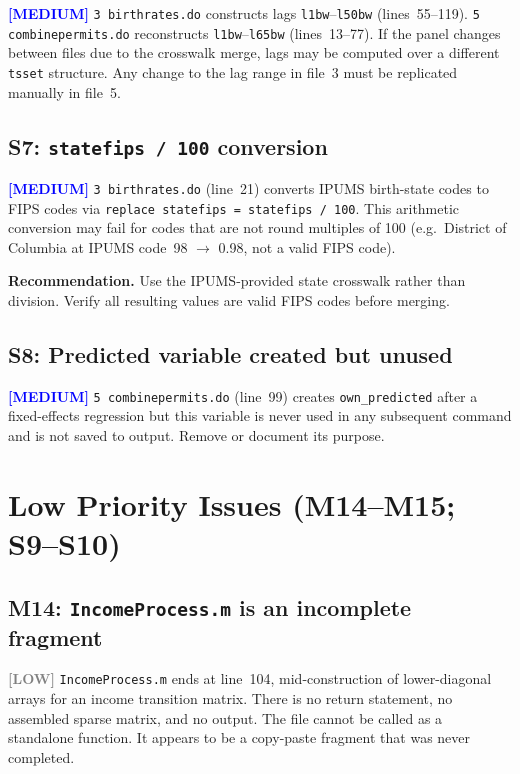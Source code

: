 \documentclass[11pt]{article}
\newcommand{\medium}{\textcolor{blue}{\textbf{[MEDIUM]}}}
\newcommand{\low}{\textcolor{gray}{\textbf{[LOW]}}}
\begin{document}
\medium{} \texttt{3 birthrates.do} constructs lags \texttt{l1bw}--\texttt{l50bw}
(lines~55--119). \texttt{5 combinepermits.do} reconstructs \texttt{l1bw}--\texttt{l65bw}
(lines~13--77). If the panel changes between files due to the crosswalk merge,
lags may be computed over a different \texttt{tsset} structure. Any change to the
lag range in file~3 must be replicated manually in file~5.

\subsection*{S7: \texttt{statefips / 100} conversion}

\medium{} \texttt{3 birthrates.do} (line~21) converts IPUMS birth-state codes to
FIPS codes via \texttt{replace statefips = statefips / 100}. This arithmetic
conversion may fail for codes that are not round multiples of 100 (e.g.\
District of Columbia at IPUMS code~98 $\to$ 0.98, not a valid FIPS code).

\noindent\textbf{Recommendation.} Use the IPUMS-provided state crosswalk rather
than division. Verify all resulting values are valid FIPS codes before merging.

\subsection*{S8: Predicted variable created but unused}

\medium{} \texttt{5 combinepermits.do} (line~99) creates \texttt{own\_predicted}
after a fixed-effects regression but this variable is never used in any subsequent
command and is not saved to output. Remove or document its purpose.

\section*{Low Priority Issues (M14--M15; S9--S10)}

\subsection*{M14: \texttt{IncomeProcess.m} is an incomplete fragment}

\low{} \texttt{IncomeProcess.m} ends at line~104, mid-construction of lower-diagonal
arrays for an income transition matrix. There is no return statement, no assembled
sparse matrix, and no output. The file cannot be called as a standalone function.
It appears to be a copy-paste fragment that was never completed.
\end{document}
